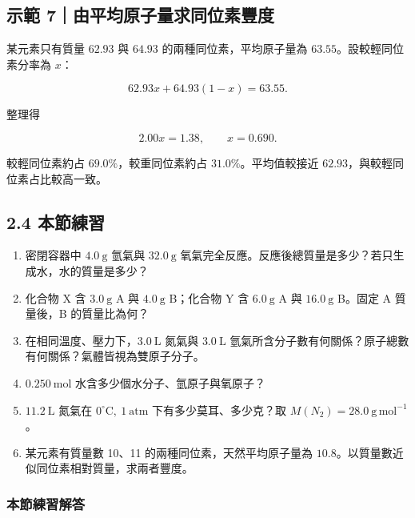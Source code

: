 \documentclass[11pt,a4paper]{article}
\providecommand{\tightlist}{%
  \setlength{\itemsep}{0pt}\setlength{\parskip}{0pt}}
\begin{document}
\begin{HandoutWorkedExample}

\subsection{示範 7｜由平均原子量求同位素豐度}\label{ux793aux7bc4-7ux7531ux5e73ux5747ux539fux5b50ux91cfux6c42ux540cux4f4dux7d20ux8c50ux5ea6}

某元素只有質量 \(62.93\) 與 \(64.93\) 的兩種同位素，平均原子量為 \(63.55\)。設較輕同位素分率為 \(x\)：

\[
62.93x+64.93(1-x)=63.55.
\]

整理得

\[
2.00x=1.38,\qquad x=0.690.
\]

較輕同位素約占 \(69.0\%\)，較重同位素約占 \(31.0\%\)。平均值較接近 \(62.93\)，與較輕同位素占比較高一致。

\end{HandoutWorkedExample}

\subsection{2.4 本節練習}\label{ux672cux7bc0ux7df4ux7fd2-1}

\begin{enumerate}
\def\labelenumi{\arabic{enumi}.}
\tightlist
\item
  密閉容器中 \(4.0\ \mathrm g\) 氫氣與 \(32.0\ \mathrm g\) 氧氣完全反應。反應後總質量是多少？若只生成水，水的質量是多少？
\item
  化合物 X 含 \(3.0\ \mathrm g\) A 與 \(4.0\ \mathrm g\) B；化合物 Y 含 \(6.0\ \mathrm g\) A 與 \(16.0\ \mathrm g\) B。固定 A 質量後，B 的質量比為何？
\item
  在相同溫度、壓力下，\(3.0\ \mathrm L\) 氮氣與 \(3.0\ \mathrm L\) 氫氣所含分子數有何關係？原子總數有何關係？氣體皆視為雙原子分子。
\item
  \(0.250\ \mathrm{mol}\) 水含多少個水分子、氫原子與氧原子？
\item
  \(11.2\ \mathrm L\) 氮氣在 \(0^\circ\mathrm C,\ 1\ \mathrm{atm}\) 下有多少莫耳、多少克？取 \(M(N_2)=28.0\ \mathrm{g\,mol^{-1}}\)。
\item
  某元素有質量數 10、11 的兩種同位素，天然平均原子量為 \(10.8\)。以質量數近似同位素相對質量，求兩者豐度。
\end{enumerate}

\subsubsection{本節練習解答}\label{ux672cux7bc0ux7df4ux7fd2ux89e3ux7b54-1}
\end{document}
